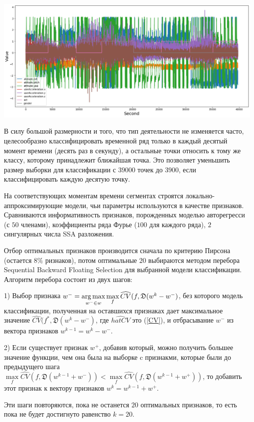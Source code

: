 \documentclass[12pt, twoside]{article}
\begin{document}
\includegraphics{data}

В силу большой размерности и того, что тип деятельности не изменяется часто, целесообразно классифицировать временной ряд только в каждый десятый момент времени (десять раз в секунду), а остальные точки относить к тому же классу, которому принадлежит ближайшая точка. Это позволяет уменьшить размер выборки для классификации с $39000$ точек до $3900$, если классифицировать каждую десятую точку.

На соответствующих моментам времени сегментах строятся локально-аппроксимирующие модели, чьи параметры используются в качестве признаков. Сравниваются информативность признаков, порожденных моделью авторегресси (с $50$ членами), коэффициенты ряда Фурье ($100$ для каждого ряда), $2$ сингулярных числа SSA разложения. 

Отбор оптимальных признаков производится сначала по критерию Пирсона (остается $8\%$ ризнаков), потом оптимальные $20$ выбираются методом перебора Sequential Backward Floating Selection \cite{Somol10} для выбранной модели классификации. Алгоритм перебора состоит из двух шагов:

1) Выбор признака $w^- = \argmax\limits_{w^- \in w} \max\limits_{f}\widehat{CV}(f, \mathfrak{D}(w^k-w^-)$, без которого модель классификации, полученная на оставшихся признаках дает максимальное значение $\widehat{CV}(f^*, \mathfrak{D}(w^k-w^-)$, где $\widehat{hat{CV}}$ это (\ref{CV}), и отбрасывание $w^-$ из вектора признаков $w^{k-1}=w^k-w^-$.

2) Если существует признак $w^+$, добавив который, можно получить большее значение функции, чем она была на выборке c признакми, которые были до предыдущего шага $\max\limits_f \widehat{CV}(f, \mathfrak{D}(w^{k-1}+w^-))<\max\limits_f \widehat{CV}(f, \mathfrak{D}(w^{k-1}+w^+))$, то добавить этот признак к вектору признаков $w^k = w^{k-1}+w^+$.

Эти шаги повторяются, пока не останется $20$ оптимальных признаков, то есть пока не будет достигнуто равенство $k =20$.
\end{document}
